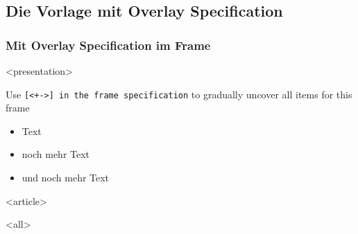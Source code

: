 \subsection{Die Vorlage mit Overlay Specification}
{%
\begin{frame}[<+->][fragile,t]
\frametitle<presentation>{Mit Overlay Specification im Frame}




\mode
<presentation>

	Use \texttt{[<+->] in the frame specification} to gradually
	uncover all items for this frame

\begin{itemize}
 \item Text
 \item noch mehr Text
 \item und noch mehr Text
\end{itemize}

\mode
<article>

\mode
<all>

\end{frame}
}

\newpage
